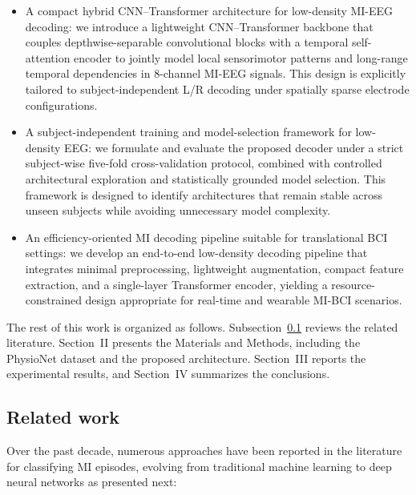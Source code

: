 \documentclass[a4paper,fleqn]{cas-dc}
\begin{document}
\begin{itemize}
    \item A compact hybrid CNN–Transformer architecture for low-density MI-EEG decoding: we introduce a lightweight CNN–Transformer backbone that couples depthwise-separable convolutional blocks with a temporal self-attention encoder to jointly model local sensorimotor patterns and long-range temporal dependencies in 8-channel MI-EEG signals. This design is explicitly tailored to subject-independent L/R decoding under spatially sparse electrode configurations.
    \item A subject-independent training and model-selection framework for low-density EEG: we formulate and evaluate the proposed decoder under a strict subject-wise five-fold cross-validation protocol, combined with controlled architectural exploration and statistically grounded model selection. This framework is designed to identify architectures that remain stable across unseen subjects while avoiding unnecessary model complexity.
    
    \item An efficiency-oriented MI decoding pipeline suitable for translational BCI settings: we develop an end-to-end low-density decoding pipeline that integrates minimal preprocessing, lightweight augmentation, compact feature extraction, and a single-layer Transformer encoder, yielding a resource-constrained design appropriate for real-time and wearable MI-BCI scenarios.
\end{itemize}

The rest of this work is organized as follows. Subsection~\ref{subsec:related_work} reviews the related literature. Section~II presents the Materials and Methods, including the PhysioNet dataset and the proposed architecture. Section~III reports the experimental results, and Section~IV summarizes the conclusions.


\subsection{Related work}
\label{subsec:related_work}

Over the past decade, numerous approaches have been reported in the literature for classifying MI episodes, evolving from traditional machine learning to deep neural networks as presented next:
\end{document}
